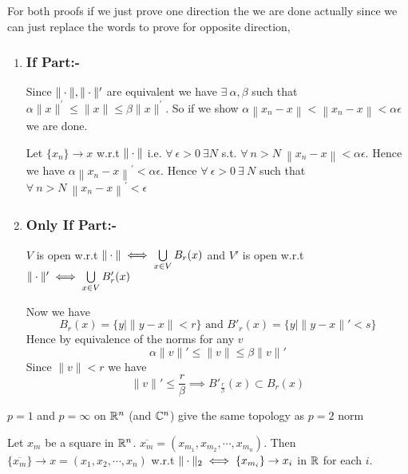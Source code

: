 \begin{myproof}
	For both proofs if we just prove one direction the we are done actually since we can just replace 
	the words to prove for opposite direction,
	\begin{enumerate}[label=(\roman*)]
		\item \parinn\subsubsection{If Part:-}
		Since $\|\cdot\|,\|\cdot\|^{\prime}$ are equivalent we have $\exists\ \alpha, \beta$ such that $\alpha\|x\|^{\prime} \leq\|x\| \leq \beta\|x\|^{\prime}$. So if we show $\alpha\left\|x_{n}-x\right\|<\left\|x_{n}-x\right\|<\alpha \epsilon$ we are done.
		
		Let $\{x_{n}\} \to x$ w.r.t $\|\cdot\|$ i.e. $\forall\ \epsilon>0\ \exists N$ s.t. $\forall\ n>N\ \left\|x_{n}-x\right\|<\alpha \epsilon$. Hence we have $\alpha\left\|x_{n}-x\right\|^{\prime}<\alpha \epsilon$. Hence $\forall \ \epsilon>0\ \exists\ N$ such that $\forall\ n>N\ \left\|x_{n}-x\right\|^{\prime}<\epsilon$\Qed
	
		\item \subsubsection{Only If Part:-}\parinn
		$V$ is open w.r.t $\|\cdot\|\iff\bigcup\limits_{x\in V}B_r(x)$ and $V'$ is open w.r.t $\|\cdot\|'\iff\bigcup\limits_{x\in V}B'_r(x)$
		
		Now we have $$B_r(x)=\{y\mid \|y-x\|<r\}\text{ and } B'_r(x)=\{y\mid \|y-x\|'<s\}$$Hence by equivalence of the norms for any $v$ $$\alpha \|v\|'\leq \|v\|\leq \beta\|v\|'$$ Since $\|v\|<r$ we have $$\|v\|'\leq \frac{r}{\beta}\implies B'_{\frac{r}{\beta}}(x)\subset B_r(x)$$
	\end{enumerate}

\end{myproof}
\begin{corollary}{}{}
	$p=1$ and $p=\infty$ on $\mathbb{R}^n$ (and $\mathbb{C}^n$) give the same topology as $p=2$ norm
\end{corollary}
\begin{corollary}{}{}
	Let $x_m$ be a square in $\mathbb{R}^n$. $\overline{x_m}=(x_{m_1},x_{m_2},\cdots,x_{m_n})$. Then $\{\overline{x_m}\}\to x=(x_1,x_2,\cdots,x_n)$ w.r.t $\|\cdot\|_2\iff \{x_{m_i}\}\to x_i$ in $\mathbb{R}$ for each $i$.
\end{corollary}
